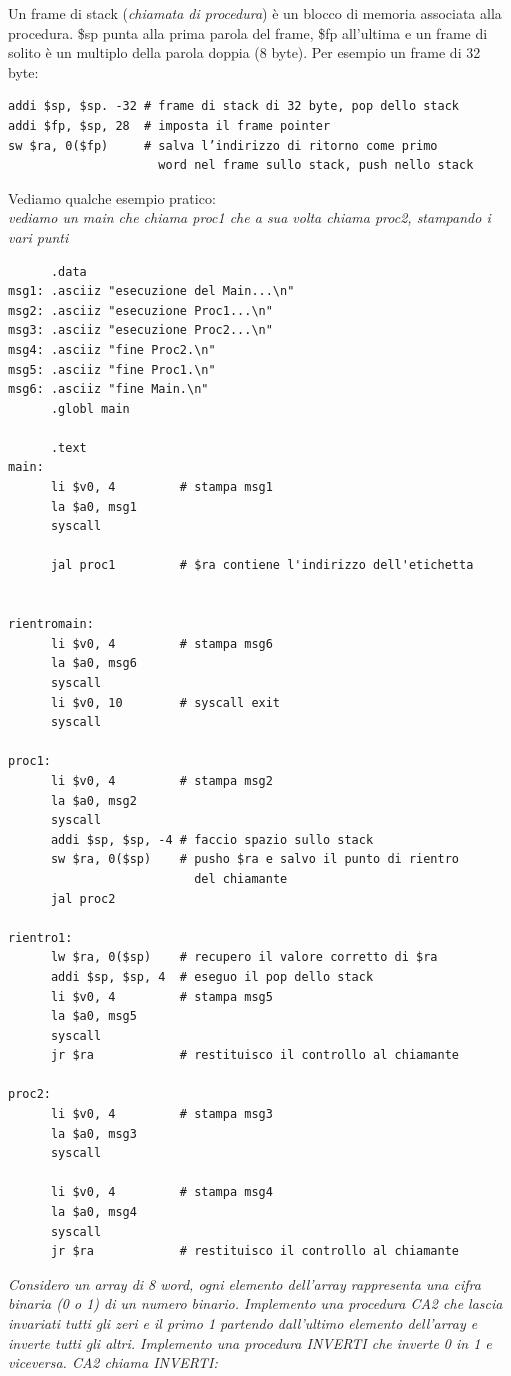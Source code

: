 \documentclass[a4paper,12pt, oneside]{book}
\begin{document}
Un frame di stack (\textit{chiamata di procedura}) è un blocco di memoria associata alla procedura. \$sp punta alla prima parola del frame, \$fp all'ultima e un frame di solito è un multiplo della parola doppia (8 byte). Per esempio un frame di 32 byte:
\begin{verbatim}
addi $sp, $sp. -32 # frame di stack di 32 byte, pop dello stack
addi $fp, $sp, 28  # imposta il frame pointer
sw $ra, 0($fp)     # salva l’indirizzo di ritorno come primo
                     word nel frame sullo stack, push nello stack
\end{verbatim}
Vediamo qualche esempio pratico:\\
\textit{vediamo un main che chiama proc1 che a sua volta chiama proc2, stampando i vari punti}
\begin{verbatim}
      .data
msg1: .asciiz "esecuzione del Main...\n"
msg2: .asciiz "esecuzione Proc1...\n"
msg3: .asciiz "esecuzione Proc2...\n"
msg4: .asciiz "fine Proc2.\n"
msg5: .asciiz "fine Proc1.\n"
msg6: .asciiz "fine Main.\n"
      .globl main
      
      .text
main:  
      li $v0, 4         # stampa msg1
      la $a0, msg1
      syscall
      
      jal proc1         # $ra contiene l'indirizzo dell'etichetta
      
      
rientromain:
      li $v0, 4         # stampa msg6
      la $a0, msg6
      syscall
      li $v0, 10        # syscall exit
      syscall
      
proc1:
      li $v0, 4         # stampa msg2
      la $a0, msg2
      syscall
      addi $sp, $sp, -4 # faccio spazio sullo stack
      sw $ra, 0($sp)    # pusho $ra e salvo il punto di rientro
                          del chiamante
      jal proc2

rientro1:
      lw $ra, 0($sp)    # recupero il valore corretto di $ra
      addi $sp, $sp, 4  # eseguo il pop dello stack
      li $v0, 4         # stampa msg5
      la $a0, msg5
      syscall
      jr $ra            # restituisco il controllo al chiamante
     
proc2:
      li $v0, 4         # stampa msg3
      la $a0, msg3
      syscall
      
      li $v0, 4         # stampa msg4
      la $a0, msg4
      syscall
      jr $ra            # restituisco il controllo al chiamante
\end{verbatim}
\textit{Considero un array di 8 word, ogni elemento dell'array rappresenta una cifra binaria (0 o 1) di un numero binario. Implemento una procedura  CA2 che lascia invariati tutti gli zeri e il primo 1 partendo dall'ultimo elemento dell'array e inverte tutti gli altri. Implemento una procedura INVERTI che inverte 0 in 1 e viceversa. CA2 chiama INVERTI:}
\end{document}
